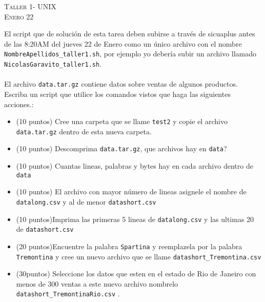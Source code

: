\documentclass[11pt]{article}
\begin{document}
\begin{center}
\textsc{\LARGE Taller 1- UNIX}\\
\textsc{\large Enero 22 }
\end{center}


El script  que de soluci\'on de esta tarea deben subirse a
trav\'es de sicuaplus antes de las 8:20AM del jueves 22 de Enero como
un \'unico archivo con el nombre
\verb"NombreApellidos_taller1.sh", por ejemplo yo deber\'ia subir un
archivo llamado \verb"NicolasGaravito_taller1.sh".\\
\\
El archivo \verb"data.tar.gz" contiene datos sobre ventas de algunos productos.\\

Escriba un script que utilice los comandos vistos que haga las siguientes acciones.:
\begin{itemize}
\item (10 puntos) Cree una carpeta que se llame \verb+test2+ y copie el archivo \verb|data.tar.gz| dentro de esta nueva carpeta. 
\item (10 puntos) Descomprima \verb|data.tar.gz|, que archivos hay en \verb|data|?
\item (10 puntos) Cuantas lineas, palabras y bytes hay en cada archivo dentro de \verb|data| 
\item (10 puntos) El archivo con mayor n\'umero de lineas asignele el nombre de \verb|datalong.csv| y al de menor \verb|datashort.csv|
\item (10 puntos)Imprima las primeras 5 lineas de \verb|datalong.csv| y las ultimas 20 de \verb|datashort.csv|
\item (20 puntos)Encuentre la palabra \verb|Spartina| y reemplazela por la palabra \verb|Tremontina| y cree un nuevo archivo que se llame \verb|datashort_Tremontina.csv|

\item (30puntos) Seleccione los datos que esten en el estado de Rio de Janeiro con menos de 300 ventas a este nuevo archivo nombrelo \verb+datashort_TremontinaRio.csv+ .
 
\end{itemize}
\end{document}
